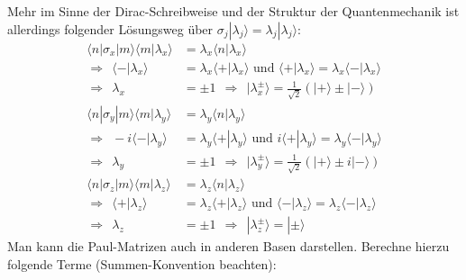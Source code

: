 \documentclass[a4paper,12pt]{article}
\newcommand{\brak}{}
\newcommand{\braket}{}
\newcommand{\kla}{}
\newcommand{\tecxt}{}
\newcommand{\Ket}{}
\begin{document}
Mehr im Sinne der Dirac-Schreibweise und der Struktur der Quantenmechanik ist allerdings folgender Lösungsweg über $\sigma_j\Ket| {\lambda_j}\rangle =\lambda_j\Ket| {\lambda_j}\rangle $:
\begin{align*}
\braket\langle {n} | {\sigma_x} | {m}\rangle\brak\langle {m}| {\lambda_x}\rangle&=\lambda_x\brak\langle {n}| {\lambda_x}\rangle\\
\Rightarrow\ \ \brak\langle {-}| {\lambda_x}\rangle&=\lambda_x\brak\langle {+}| {\lambda_x}\rangle\tecxt\text{ \ und \ }\brak\langle {+}| {\lambda_x}\rangle=\lambda_x\brak\langle {-}| {\lambda_x}\rangle\\
\Rightarrow\ \ \lambda_x&=\pm 1\ \ \Rightarrow\ \ \Ket| {\lambda_x^\pm}\rangle = \frac{1}{\sqrt{2}}\kla\left( {\Ket| {+}\rangle \pm\Ket| {-}\rangle } \right)\\
\braket\langle {n} | {\sigma_y} | {m}\rangle\brak\langle {m}| {\lambda_y}\rangle&=\lambda_y\brak\langle {n}| {\lambda_y}\rangle\\
\Rightarrow\ \ -i\brak\langle {-}| {\lambda_y}\rangle&=\lambda_y\brak\langle {+}| {\lambda_y}\rangle\tecxt\text{ \ und \ }i\brak\langle {+}| {\lambda_y}\rangle=\lambda_y\brak\langle {-}| {\lambda_y}\rangle\\
\Rightarrow\ \ \lambda_y&=\pm 1\ \ \Rightarrow\ \ \Ket| {\lambda_y^\pm}\rangle = \frac{1}{\sqrt{2}}\kla\left( {\Ket| {+}\rangle \pm i\Ket| {-}\rangle } \right)\\
\braket\langle {n} | {\sigma_z} | {m}\rangle\brak\langle {m}| {\lambda_z}\rangle&=\lambda_z\brak\langle {n}| {\lambda_z}\rangle\\
\Rightarrow\ \ \brak\langle {+}| {\lambda_z}\rangle&=\lambda_z\brak\langle {+}| {\lambda_z}\rangle\tecxt\text{ \ und \ }\brak\langle {-}| {\lambda_z}\rangle=\lambda_z\brak\langle {-}| {\lambda_z}\rangle\\
\Rightarrow\ \ \lambda_z&=\pm 1\ \ \Rightarrow\ \ \Ket| {\lambda_z^\pm}\rangle = \Ket | {\pm} \rangle
\end{align*}
Man kann die Paul-Matrizen auch in anderen Basen darstellen. Berechne hierzu folgende Terme (Summen-Konvention beachten):
\end{document}
